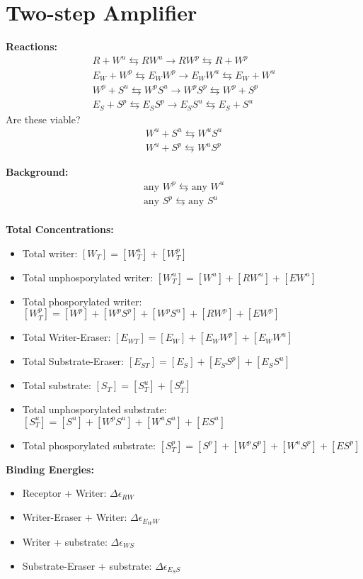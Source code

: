 \documentclass[aps,onecolumn,superscriptaddress,notitlepage]{revtex4-1}
\begin{document}
\section{Two-step Amplifier}

\textbf{Reactions:}
\begin{gather}
R + W^u \leftrightarrows RW^u \rightarrow RW^p \leftrightarrows R + W^p\\
E_W + W^p \leftrightarrows E_WW^p \rightarrow E_WW^u \leftrightarrows E_W + W^u\\
W^p + S^u \leftrightarrows W^pS^u \rightarrow W^pS^p \leftrightarrows W^p + S^p\\
E_S + S^p \leftrightarrows E_SS^p \rightarrow E_SS^u \leftrightarrows E_S + S^u
\end{gather}
Are these viable?
\begin{align}
W^u + S^u \leftrightarrows W^uS^u\\
W^u + S^p \leftrightarrows W^uS^p
\end{align}

\textbf{Background:}
\begin{gather}
\text{any } W^p \leftrightarrows \text{any } W^u\\
\text{any } S^p \leftrightarrows \text{any } S^u\\
\end{gather}

\textbf{Total Concentrations:}
\begin{itemize}
\item Total writer: $[W_T] = [W^u_T] + [W^p_T]$
\item Total unphosporylated writer: $[W^u_T] = [W^u] + [RW^u] + [EW^u]$
\item Total phosporylated writer: $[W^p_T] = [W^p] + [W^pS^p] + [W^pS^u] + [RW^p] + [EW^p]$
\item Total Writer-Eraser: $[E_{WT}] = [E_W]  + [E_WW^p] + [E_WW^u]$
\item Total Substrate-Eraser: $[E_{ST}] = [E_S]  + [E_SS^p] + [E_SS^u]$
\item Total substrate: $[S_T] = [S^u_T] + [S^p_T]$
\item Total unphosporylated substrate: $[S^u_T] = [S^u] + [W^pS^u] + [W^uS^u] + [ES^u]$
\item Total phosporylated substrate: $[S^p_T] = [S^p] +  [W^pS^p] + [W^uS^p] + [ES^p]$
\end{itemize}


\textbf{Binding Energies:}
\begin{itemize}
\item Receptor + Writer: $\Delta\epsilon_{RW}$
\item Writer-Eraser + Writer: $\Delta\epsilon_{E_WW}$
\item Writer + substrate: $\Delta\epsilon_{WS}$
\item Substrate-Eraser + substrate: $\Delta\epsilon_{E_SS}$
\end{itemize}
\end{document}
